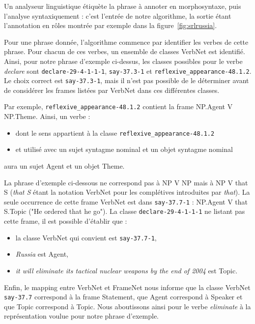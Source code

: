 Un analyseur linguistique étiquète la phrase à annoter en morphosyntaxe, puis
l'analyse syntaxiquement : c'est l'entrée de notre algorithme, la sortie étant
l'annotation en rôles montrée par exemple dans la figure~\ref{fig:srlrussia}.

Pour une phrase donnée, l'algorithme commence par identifier les verbes de
cette phrase. Pour chacun de ces verbes, un ensemble de classes VerbNet est
identifié. Ainsi, pour notre phrase d'exemple ci-dessus, les classes possibles
pour le verbe \emph{declare} sont \texttt{declare-29-4-1-1-1},
\texttt{say-37.3-1} et \texttt{reflexive\_appearance-48.1.2}. Le choix correct
est \texttt{say-37.3-1}, mais il n'est pas possible de le déterminer avant de
considérer les frames listées par VerbNet dans ces différentes classes.


Par exemple, \texttt{reflexive\_appearance-48.1.2} contient la frame NP.Agent V
NP.Theme. Ainsi, un verbe :
\begin{itemize}
    \item dont le sens appartient à la classe \texttt{reflexive\_appearance-48.1.2}
    \item et utilisé avec un sujet syntagme nominal et un objet syntagme nominal
\end{itemize}
aura un sujet Agent et un objet Theme.

La phrase d'exemple ci-dessous ne correspond pas à NP V NP mais à NP V that S
(\emph{that S} étant la notation VerbNet pour les complétives introduites par
\emph{that}). La seule occurrence de cette frame VerbNet est dans
\texttt{say-37.7-1} : NP.Agent V that S.Topic ("He ordered that he go").  La
classe \texttt{declare-29-4-1-1-1} ne listant pas cette frame, il est possible
d'établir que :
\begin{itemize}
    \item la classe VerbNet qui convient est \texttt{say-37.7-1},
    \item \emph{Russia} est Agent,
    \item \emph{it will eliminate its tactical nuclear weapons by the end of 2004} est Topic.
\end{itemize}
        
Enfin, le mapping entre VerbNet et FrameNet nous informe que la classe VerbNet
\texttt{say-37.7} correspond à la frame Statement, que Agent correspond à
Speaker et que Topic correspond à Topic.  Nous aboutissons ainsi pour le verbe
\emph{eliminate} à la représentation voulue pour notre phrase d'exemple.

